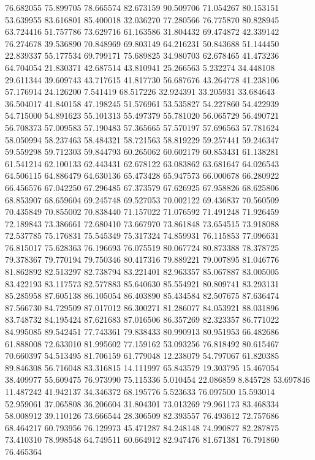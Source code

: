 76.682055
75.899705
78.665574
82.673159
90.509706
71.054267
80.153151
53.639955
83.616801
85.400018
32.036270
77.280566
76.775870
80.828945
63.724416
51.757786
73.629716
61.163586
31.804432
69.474872
42.339142
76.274678
39.536890
70.848969
69.803149
64.216231
50.843688
51.144450
22.839337
55.177534
69.799171
75.689825
34.980703
62.678465
41.473236
64.704054
21.830371
42.687514
43.810941
25.266563
5.232274
34.448108
29.611344
39.609743
43.717615
41.817730
56.687676
43.264778
41.238106
57.176914
24.126200
7.541419
68.517226
32.924391
33.205931
33.684643
36.504017
41.840158
47.198245
51.576961
53.535827
54.227860
54.422939
54.715000
54.891623
55.101313
55.497379
55.781020
56.065729
56.490721
56.708373
57.009583
57.190483
57.365665
57.570197
57.696563
57.781624
58.050994
58.237463
58.484321
58.721563
58.819229
59.257441
59.246347
59.559298
59.712303
59.844793
60.265062
60.602179
60.853431
61.138281
61.541214
62.100133
62.443431
62.678122
63.083862
63.681647
64.026543
64.506115
64.886479
64.630136
65.473428
65.947573
66.000678
66.280922
66.456576
67.042250
67.296485
67.373579
67.626925
67.958826
68.625806
68.853907
68.659604
69.245748
69.527053
70.002122
69.436837
70.560509
70.435849
70.855002
70.838440
71.157022
71.076592
71.491248
71.926459
72.189843
73.386661
72.680410
73.667970
73.861848
73.654515
73.918088
72.537785
75.176831
75.545349
75.317324
74.859931
76.115853
77.096631
76.815017
75.628363
76.196693
76.075519
80.067724
80.873388
78.378725
79.378367
79.770194
79.750346
80.417316
79.889221
79.007895
81.046776
81.862892
82.513297
82.738794
83.221401
82.963357
85.067887
83.005005
83.422193
83.117573
82.577883
85.640630
85.554921
80.809741
83.293131
85.285958
87.605138
86.105054
86.403890
85.434584
82.507675
87.636474
87.566730
84.729509
87.017012
86.300271
81.286077
84.053921
88.031896
83.748732
84.195424
87.621683
87.016506
86.357269
82.323357
86.771022
84.995085
89.542451
77.743361
79.838433
80.990913
80.951953
66.482686
61.888008
72.633010
81.995602
77.159162
53.093256
76.818492
80.615467
70.660397
54.513495
81.706159
61.779048
12.238079
54.797067
61.820385
89.846308
56.716048
83.316815
14.111997
65.843579
19.303795
15.467054
38.409977
55.609475
76.973990
75.115336
5.010454
22.086859
8.845728
53.697846
11.487242
41.942137
34.346372
68.195776
5.523633
76.097500
15.593014
52.959061
37.065808
36.206604
31.804301
73.013269
79.961173
83.468334
58.008912
39.110126
73.666544
28.306509
82.393557
76.493612
72.757686
68.464217
60.793956
76.129973
45.471287
84.248148
74.990877
82.287875
73.410310
78.998548
64.749511
60.664912
82.947476
81.671381
76.791860
76.465364
